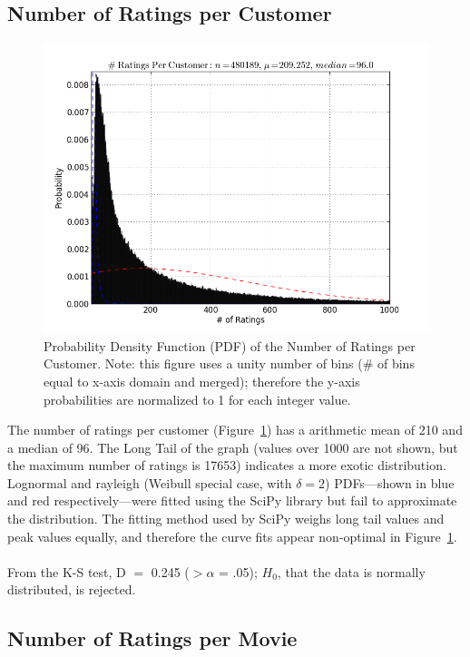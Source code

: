 \documentclass[prodmode,acmtecs]{acmsmall}
\begin{document}
\subsection{Number of Ratings per Customer}

\begin{figure}
\centerline{\includegraphics[scale=.6]{num_ratings_per_customer.png}}
\caption{Probability Density Function (PDF) of the Number of Ratings per Customer. Note: this figure uses a unity number of bins (\# of bins equal to x-axis domain and merged); therefore the y-axis probabilities are normalized to 1 for each integer value.}
\label{fig:five}
\end{figure}

The number of ratings per customer (Figure~\ref{fig:five}) has a arithmetic mean of 210 and a median of 96. The Long Tail of the graph (values over 1000 are not shown, but the maximum number of ratings is 17653) indicates a more exotic distribution. Lognormal and rayleigh (Weibull special case, with $\delta = 2$) PDFs---shown in blue and red respectively---were fitted using the SciPy library but fail to approximate the distribution. The fitting method used by SciPy weighs long tail values and peak values equally, and therefore the curve fits appear non-optimal in Figure~\ref{fig:five}.
\\
\\
From the K-S test, D $=$ 0.245 ($>\alpha$ = .05); $H_0$, that the data is normally distributed, is rejected.

\subsection{Number of Ratings per Movie}
\end{document}

